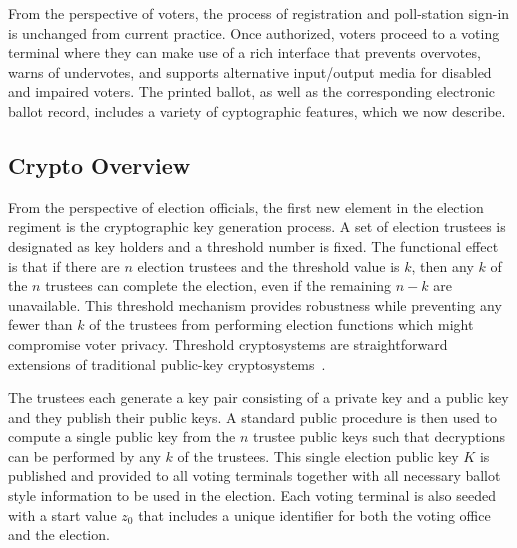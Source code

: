 \label{sec:design}

From the perspective of voters, the process of registration and poll-station sign-in is unchanged from current practice.  Once authorized, voters proceed to a voting terminal where they can make use of a rich interface that prevents overvotes, warns of undervotes, and supports alternative input/output media for disabled and impaired voters. The printed ballot, as well as the corresponding electronic ballot record, includes a variety of cyptographic features, which we now describe.




\subsection{Crypto Overview}
From the perspective of election officials, the first new element in the election regiment is the cryptographic key generation process.  A set of election trustees is designated as key holders and a threshold number is fixed.  The functional effect is that if there are $n$ election trustees and the threshold value is $k$, then any $k$ of the $n$ trustees can complete the election, even if the remaining $n-k$ are unavailable.  This threshold mechanism provides robustness while preventing any fewer than $k$ of the trustees from performing election functions which might compromise voter privacy. Threshold cryptosystems are straightforward extensions of traditional public-key cryptosystems~\cite{desmedt90threshold}.

The trustees each generate a key pair consisting of a private key and
a public key and they publish their public keys.  A standard public
procedure is then used to compute a single public key from the $n$
trustee public keys such that decryptions can be performed by any $k$
of the trustees.  This single election public key $K$ is published and
provided to all voting terminals together with all necessary
ballot style information to be used in the election.  Each voting terminal is also seeded with a start value $z_0$ that includes a
unique identifier for both the voting office and the election.

